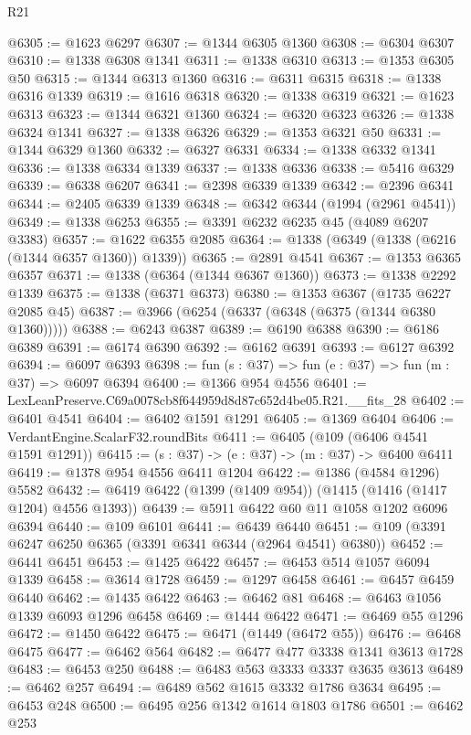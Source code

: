 \begin{lexlean}{R21}
\begin{coremodule}
@6305 := @1623 @6297
@6307 := @1344 @6305 @1360
@6308 := @6304 @6307
@6310 := @1338 @6308 @1341
@6311 := @1338 @6310
@6313 := @1353 @6305 @50
@6315 := @1344 @6313 @1360
@6316 := @6311 @6315
@6318 := @1338 @6316 @1339
@6319 := @1616 @6318
@6320 := @1338 @6319
@6321 := @1623 @6313
@6323 := @1344 @6321 @1360
@6324 := @6320 @6323
@6326 := @1338 @6324 @1341
@6327 := @1338 @6326
@6329 := @1353 @6321 @50
@6331 := @1344 @6329 @1360
@6332 := @6327 @6331
@6334 := @1338 @6332 @1341
@6336 := @1338 @6334 @1339
@6337 := @1338 @6336
@6338 := @5416 @6329
@6339 := @6338 @6207
@6341 := @2398 @6339 @1339
@6342 := @2396 @6341
@6344 := @2405 @6339 @1339
@6348 := @6342 @6344 (@1994 (@2961 @4541))
@6349 := @1338 @6253
@6355 := @3391 @6232 @6235 @45 (@4089 @6207 @3383)
@6357 := @1622 @6355 @2085
@6364 := @1338 (@6349 (@1338 (@6216 (@1344 @6357 @1360)) @1339))
@6365 := @2891 @4541
@6367 := @1353 @6365 @6357
@6371 := @1338 (@6364 (@1344 @6367 @1360))
@6373 := @1338 @2292 @1339
@6375 := @1338 (@6371 @6373)
@6380 := @1353 @6367 (@1735 @6227 @2085 @45)
@6387 := @3966 (@6254 (@6337 (@6348 (@6375 (@1344 @6380 @1360)))))
@6388 := @6243 @6387
@6389 := @6190 @6388
@6390 := @6186 @6389
@6391 := @6174 @6390
@6392 := @6162 @6391
@6393 := @6127 @6392
@6394 := @6097 @6393
@6398 := fun (s : @37) => fun (e : @37) => fun (m : @37) => @6097 @6394
@6400 := @1366 @954 @4556
@6401 := LexLeanPreserve.C69a0078cb8f644959d8d87c652d4be05.R21.__fits_28
@6402 := @6401 @4541
@6404 := @6402 @1591 @1291
@6405 := @1369 @6404
@6406 := VerdantEngine.ScalarF32.roundBits
@6411 := @6405 (@109 (@6406 @4541 @1591 @1291))
@6415 := (s : @37) -> (e : @37) -> (m : @37) -> @6400 @6411
@6419 := @1378 @954 @4556 @6411 @1204
@6422 := @1386 (@4584 @1296) @5582
@6432 := @6419 @6422 (@1399 (@1409 @954)) (@1415 (@1416 (@1417 @1204) @4556 @1393))
@6439 := @5911 @6422 @60 @11 @1058 @1202 @6096 @6394
@6440 := @109 @6101
@6441 := @6439 @6440
@6451 := @109 (@3391 @6247 @6250 @6365 (@3391 @6341 @6344 (@2964 @4541) @6380))
@6452 := @6441 @6451
@6453 := @1425 @6422
@6457 := @6453 @514 @1057 @6094 @1339
@6458 := @3614 @1728
@6459 := @1297 @6458
@6461 := @6457 @6459 @6440
@6462 := @1435 @6422
@6463 := @6462 @81
@6468 := @6463 @1056 @1339 @6093 @1296 @6458
@6469 := @1444 @6422
@6471 := @6469 @55 @1296
@6472 := @1450 @6422
@6475 := @6471 (@1449 (@6472 @55))
@6476 := @6468 @6475
@6477 := @6462 @564
@6482 := @6477 @477 @3338 @1341 @3613 @1728
@6483 := @6453 @250
@6488 := @6483 @563 @3333 @3337 @3635 @3613
@6489 := @6462 @257
@6494 := @6489 @562 @1615 @3332 @1786 @3634
@6495 := @6453 @248
@6500 := @6495 @256 @1342 @1614 @1803 @1786
@6501 := @6462 @253

\end{coremodule}
\end{lexlean}

